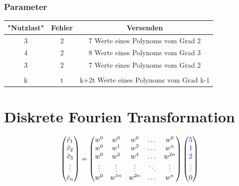 \documentclass[11pt,aspectratio=169]{beamer}
\begin{document}
	\begin{frame}
	\frametitle{Parameter}
	\begin{center}
		\begin{tabular}{ c c c } 
			\hline
			"Nutzlast" & Fehler & Versenden \\
			\hline 
			3 & 2 & 7 Werte eines Polynoms vom Grad 2 \\ 
			4 & 2 & 8 Werte eines Polynoms vom Grad 3 \\ 
			3 & 2 & 7 Werte eines Polynoms vom Grad 2 \\ 
			&&\\
			k & t & k+2t Werte eines Polynoms vom Grad k-1 \\ 
			\hline
		\end{tabular}
	\end{center}
	\end{frame}
\section{Diskrete Fourien Transformation}
	\begin{frame}
	\[
		\begin{pmatrix}
			\hat{c}_1 \\\hat{c}_2 \\\hat{c}_3 \\ \vdots \\\hat{c}_n
		\end{pmatrix}
		=
		\begin{pmatrix}
			w^0 & w^0   & w^0  & \dots  &w^0     \\
			w^0 & w^1   &w^2   & \dots  &w^n     \\ 
			w^0 & w^2   &w^4   & \dots  &w^{2n}  \\ 
			\vdots   & \vdots     &\vdots     &\ddots  &\vdots       \\
			w^0 & w^{1n}&w^{2n}& \dots  &w^{n}  \\ 
		\end{pmatrix}
		\begin{pmatrix}
			\textcolor{blue}{5}  	\\
			\textcolor{blue}{1}	\\
			\textcolor{blue}{2}	\\	 
		 \vdots  \\
		 	0  \\ 
		\end{pmatrix}
	\]
	\end{frame}
	
\end{document}
